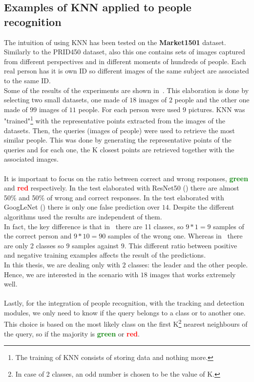 \subsection{Examples of KNN applied to people recognition}
The intuition of using KNN has been tested on the \textbf{Market1501}\cite{market1501} dataset. Similarly to the PRID450 dataset, also this one contains sets of images captured from different perspectives and in different moments of hundreds of people. Each real person has it is own ID so different images of the same subject are associated to the same ID.\\
Some of the results of the experiments are shown in~. This elaboration is done by selecting two small datasets, one made of $18$ images of $2$ people and the other one made of $99$ images of $11$ people. For each person were used $9$ pictures. KNN was "trained"\footnote{The training of KNN consists of storing data and nothing more.} with the representative points extracted from the images of the datasets. Then, the queries (images of people) were used to retrieve the most similar people. This was done by generating the representative points of the queries and for each one, the K closest points are retrieved together with the associated images.\\
\\
It is important to focus on the ratio between correct and wrong responses, \textbf{\textcolor{green}{green}} and \textbf{\textcolor{red}{red}} respectively. In the test elaborated with ResNet50 () there are almost 50\% and 50\% of wrong and correct responses. In the test elaborated with GoogLeNet () there is only one false prediction over $14$. Despite the different algorithms used the results are independent of them.\\
In fact, the key difference is that in~ there are 11 classes, so $9*1=9$ samples of the correct person and $9*10=90$ samples of the wrong one. Whereas in~ there are only 2 classes so $9$ samples against $9$. This different ratio between positive and negative training examples affects the result of the predictions.\\
In this thesis, we are dealing only with $2$ classes: the leader and the other people. Hence, we are interested in the scenario with $18$ images that works extremely well.\\
\\
Lastly, for the integration of people recognition, with the tracking and detection modules, we only need to know if the query belongs to a class or to another one. This choice is based on the most likely class on the first K\footnote{In case of 2 classes, an odd number is chosen to be the value of K.}  nearest neighbours of the query, so if the majority is \textbf{\textcolor{green}{green}} or \textbf{\textcolor{red}{red}}.

